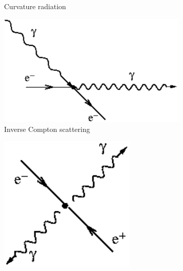 \documentclass[main.tex]{subfiles}
\begin{document}
\begin{figure}
\begin{subfigure}{0.31\textwidth}
\caption{Curvature radiation} \label{fig:1d}
\end{subfigure}
\hspace*{\fill} %
\begin{subfigure}{0.31\textwidth}
\includegraphics[width=\linewidth]{Pictures/IC.pdf}
\caption{Inverse Compton scattering} \label{fig:1e}
\end{subfigure}
\hspace*{\fill} %
\begin{subfigure}{0.31\textwidth}
\includegraphics[width=\linewidth]{Pictures/electronpositron.pdf}

\end{subfigure}
\end{figure}
\end{document}
